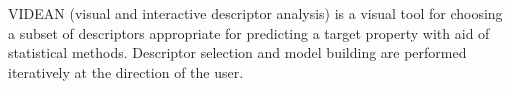 VIDEAN (visual and interactive descriptor analysis) \cite{Mart_nez_2015} is a visual tool for choosing a subset of descriptors appropriate for predicting a target property with aid of statistical methods.  Descriptor selection and model building are performed iteratively at the direction of the user.
